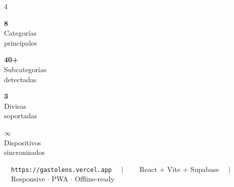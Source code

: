 \documentclass[a4paper,11pt]{article}
\begin{document}
\begin{multicols}{4}
\begin{tcolorbox}[card,colframe=ngreen!20,halign=center]
  {\color{ngreen}\LARGE\bfseries 8}\\
  {\color{tm}\scriptsize Categorías\\principales}
\end{tcolorbox}
\columnbreak
\begin{tcolorbox}[card,colframe=ncyan!20,halign=center]
  {\color{ncyan}\LARGE\bfseries 40+}\\
  {\color{tm}\scriptsize Subcategorías\\detectadas}
\end{tcolorbox}
\columnbreak
\begin{tcolorbox}[card,colframe=npurple!20,halign=center]
  {\color{npurple}\LARGE\bfseries 3}\\
  {\color{tm}\scriptsize Divisas\\soportadas}
\end{tcolorbox}
\columnbreak
\begin{tcolorbox}[card,colframe=norange!20,halign=center]
  {\color{norange}\LARGE\bfseries $\infty$}\\
  {\color{tm}\scriptsize Dispositivos\\sincronizados}
\end{tcolorbox}
\end{multicols}

\vspace{8pt}

\begin{center}
  {\color{tm}\small\faGlobe}~~{\color{ncyan}\small\texttt{https://gastolens.vercel.app}}%
  ~~{\color{bdr2}$|$}~~%
  {\color{tm}\small\faGithub}~~{\color{tm}\small React + Vite + Supabase}%
  ~~{\color{bdr2}$|$}~~%
  {\color{tm}\small\faMobileAlt}~~{\color{tm}\small Responsive $\cdot$ PWA $\cdot$ Offline-ready}
\end{center}
\end{document}
